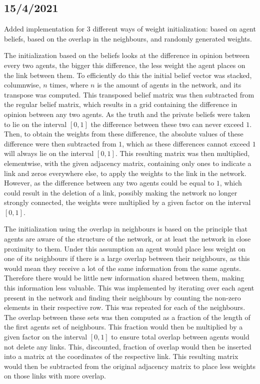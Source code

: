\documentclass{article}
\begin{document}
\subsection{15/4/2021}
Added implementation for 3 different ways of weight initialization: based on agent beliefs, based on the overlap in the neighbours, and randomly generated weights.

The initialization based on the beliefs looks at the difference in opinion between every two agents, the bigger this difference, the less weight the agent places on the link between them. To efficiently do this the initial belief vector was stacked, columnwise, $n$ times, where $n$ is the amount of agents in the network, and its transpose was computed. This transposed belief matrix was then subtracted from the regular belief matrix, which results in a grid containing the difference in opinion between any two agents. As the truth and the private beliefs were taken to lie on the interval $[0,1]$ the difference between these two can never exceed $1$. Then, to obtain the weights from these difference, the absolute values of these difference were then subtracted from $1$, which as these differences cannot exceed $1$ will always lie on the interval $[0, 1]$. This resulting matrix was then multiplied, elementwise, with the given adjacency matrix, containing only ones to indicate a link and zeros everywhere else, to apply the weights to the link in the network. However, as the difference between any two agents could be equal to $1$, which could result in the deletion of a link, possibly making the network no longer strongly connected, the weights were multiplied by a given factor on the interval $[0, 1]$.

The initialization using the overlap in neighbours is based on the principle that agents are aware of the structure of the network, or at least the network in close proximity to them. Under this assumption an agent would place less weight on one of its neighbours if there is a large overlap between their neighbours, as this would mean they receive a lot of the same information from the same agents. Therefore there would be little new information shared between them, making this information less valuable. This was implemented by iterating over each agent present in the network and finding their neighbours by counting the non-zero elements in their respective row. This was repeated for each of the neighbours. The overlap between these sets was then computed as a fraction of the length of the first agents set of neighbours. This fraction would then be multiplied by a given factor on the interval $[0, 1]$ to ensure total overlap between agents would not delete any links. This, discounted, fraction of overlap would then be inserted into a matrix at the coordinates of the respective link. This resulting matrix would then be subtracted from the original adjacency matrix to place less weights on those links with more overlap.
\end{document}
